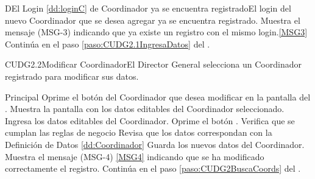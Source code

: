 	\begin{UCtrayectoriaA}{D}{El Login \ref{dd:loginC} de Coordinador ya se encuentra registrado}{El login del nuevo Coordinador que se desea agregar ya se encuentra registrado.}
			\UCpaso Muestra el mensaje (MSG-3) indicando que ya existe un registro con el mismo login.\ref{MSG3}
			\UCpaso Continúa en el paso \ref{paso:CUDG2.1IngresaDatos} del .
	\end{UCtrayectoriaA}

	\begin{UseCase}{CUDG2.2}{Modificar Coordinador}{El Director General selecciona un Coordinador registrado para modificar sus datos.}
	\end{UseCase}

	\begin{UCtrayectoria}{Principal}			
			\UCpaso[\UCactor] Oprime el botón  del Coordinador que desea modificar en la pantalla  del .	
			\UCpaso Muestra la pantalla  con los datos editables del Coordinador seleccionado.%
                        \UCpaso [\UCactor] Ingresa los datos editables del Coordinador.\label{paso:CUDG2.2IngresaDatos}
			\UCpaso [\UCactor] Oprime el botón .
			\UCpaso Verifica que se cumplan las reglas de negocio  
			\UCpaso Revisa que los datos correspondan con la Definición de Datos \ref{dd:Coordinador} 
			\UCpaso Guarda los nuevos datos del Coordinador.
			\UCpaso Muestra el mensaje (MSG-4) \ref{MSG4} indicando que se ha modificado correctamente el registro.
			\UCpaso Continúa en el paso \ref{paso:CUDG2BuscaCoords} del .
	\end{UCtrayectoria}

